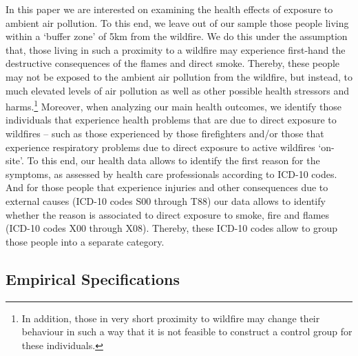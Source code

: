 \documentclass[11pt]{article}
\begin{document}
\begin{spacing}{1.5}
In this paper we are interested on examining the health effects of exposure to ambient air pollution. To this end, we leave out of our sample those people living within a `buffer zone' of 5km from the wildfire. We do this under the assumption that, those living in such a proximity to a wildfire may experience first-hand the destructive consequences of the flames and direct smoke. Thereby, these people may not be exposed to the ambient air pollution from the wildfire, but instead, to much elevated levels of air pollution as well as other possible health stressors and harms.\footnote{In addition, those in very short proximity to wildfire may change their behaviour in such a way that it is not feasible to  construct a control group for these individuals.} Moreover, when analyzing our main health outcomes, we identify those individuals that experience health problems that are due to direct exposure to wildfires -- such as those experienced by those firefighters and/or those that experience respiratory problems due to direct exposure to active wildfires  `on-site'. To this end, our health data allows to identify the first reason for the symptoms, as assessed by health care professionals according to ICD-10 codes. And for those people that experience injuries and other consequences due to external causes (ICD-10 codes S00 through T88) our data allows to identify whether the reason is associated to direct exposure to smoke, fire and flames (ICD-10 codes X00 through X08). Thereby, these ICD-10 codes allow to group those people into a separate category.


\subsection{Empirical Specifications}
\label{sscn:empirics}

\end{spacing}
\end{document}

